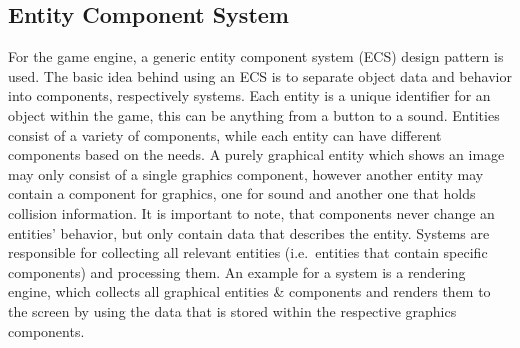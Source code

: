 \subsection{Entity Component System}\label{subsec:entity-component-system}
For the game engine, a generic entity component system (ECS) design pattern is used.
The basic idea behind using an ECS is to separate object data and behavior into components, respectively systems.
Each entity is a unique identifier for an object within the game, this can be anything from a button to a sound.
Entities consist of a variety of components, while each entity can have different components based on the needs.
A purely graphical entity which shows an image may only consist of a single graphics component, however another entity may contain
a component for graphics, one for sound and another one that holds collision information.
It is important to note, that components never change an entities' behavior, but only contain data that describes the entity.
Systems are responsible for collecting all relevant entities (i.e.\ entities that contain specific components) and processing them.
An example for a system is a rendering engine, which collects all graphical entities \& components and renders them to the screen by
using the data that is stored within the respective graphics components.
